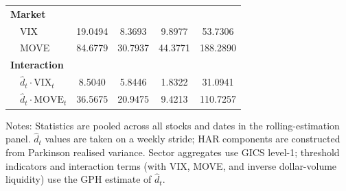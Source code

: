 \begin{table}[htbp]
\begin{tabular}{llcccc}
\midrule
\multicolumn{6}{l}{\textbf{Market}} \\
  & VIX & 19.0494 & 8.3693 & 9.8977 & 53.7306 \\
  & MOVE & 84.6779 & 30.7937 & 44.3771 & 188.2890 \\
\midrule
\multicolumn{6}{l}{\textbf{Interaction}} \\
  & $\hat d_t \cdot \mathrm{VIX}_t$ & 8.5040 & 5.8446 & 1.8322 & 31.0941 \\
  & $\hat d_t \cdot \mathrm{MOVE}_t$ & 36.5675 & 20.9475 & 9.4213 & 110.7257 \\
\bottomrule
\end{tabular}
\begin{tablenotes}\small
\item Notes: Statistics are pooled across all stocks and dates in the rolling-estimation panel. $\hat d_t$ values are taken on a weekly stride; HAR components are constructed from Parkinson realised variance. Sector aggregates use GICS level-1; threshold indicators and interaction terms (with VIX, MOVE, and inverse dollar-volume liquidity) use the GPH estimate of $\hat d_t$.
\end{tablenotes}
\end{table}
